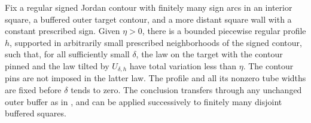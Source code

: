 \begin{lemma}
\label{buf:barrier}
Fix a regular signed Jordan contour with finitely many sign arcs in an
interior square, a buffered outer target contour, and a more distant
square wall with a constant prescribed sign.  Given $\eta>0$, there is
a bounded piecewise regular
profile $h$, supported in arbitrarily small prescribed neighborhoods
of the signed contour, such that, for all sufficiently small $\delta$,
the law on the target with the contour pinned and the law tilted by
$U_{\delta,h}$ have total variation less than $\eta$.
The contour pins are not imposed in the latter law.  The profile and
all its nonzero tube widths are fixed before $\delta$ tends to zero.
The conclusion transfers through any unchanged outer buffer as in
, and can be applied successively to finitely many
disjoint buffered squares.
\end{lemma}

